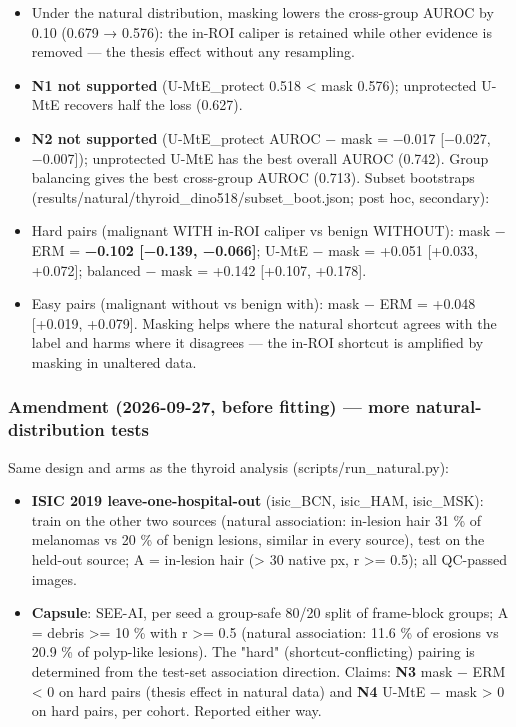 {\begin{itemize}

\item
  Under the natural distribution, masking lowers the cross-group AUROC by 0.10 (0.679 → 0.576): the in-ROI caliper is
  retained while other evidence is removed --- the thesis effect without any resampling.
\item
  \textbf{N1 not supported} (U-MtE\_protect 0.518 \textless{} mask 0.576); unprotected U-MtE recovers half the loss (0.627).
\item
  \textbf{N2 not supported} (U-MtE\_protect AUROC − mask = −0.017 {[}−0.027, −0.007{]}); unprotected U-MtE has the best overall
  AUROC (0.742). Group balancing gives the best cross-group AUROC (0.713).
  Subset bootstraps (results/natural/thyroid\_dino518/subset\_boot.json; post hoc, secondary):
\item
  Hard pairs (malignant WITH in-ROI caliper vs benign WITHOUT): mask − ERM = \textbf{−0.102 {[}−0.139, −0.066{]}};
  U-MtE − mask = +0.051 {[}+0.033, +0.072{]}; balanced − mask = +0.142 {[}+0.107, +0.178{]}.
\item
  Easy pairs (malignant without vs benign with): mask − ERM = +0.048 {[}+0.019, +0.079{]}.
  Masking helps where the natural shortcut agrees with the label and harms where it disagrees --- the in-ROI
  shortcut is amplified by masking in unaltered data.
\end{itemize}

\subsubsection{Amendment (2026-09-27, before fitting) --- more natural-distribution tests}\label{amendment-2026-09-27-before-fitting--more-natural-distribution-tests}

Same design and arms as the thyroid analysis (scripts/run\_natural.py):

\begin{itemize}

\item
  \textbf{ISIC 2019 leave-one-hospital-out} (isic\_BCN, isic\_HAM, isic\_MSK): train on the other two sources (natural
  association: in-lesion hair 31 \% of melanomas vs 20 \% of benign lesions, similar in every source), test on the held-out
  source; A = in-lesion hair (\textgreater{} 30 native px, r \textgreater= 0.5); all QC-passed images.
\item
  \textbf{Capsule}: SEE-AI, per seed a group-safe 80/20 split of frame-block groups; A = debris \textgreater= 10 \% with r \textgreater= 0.5
  (natural association: 11.6 \% of erosions vs 20.9 \% of polyp-like lesions).
  The "hard" (shortcut-conflicting) pairing is determined from the test-set association direction.
  Claims: \textbf{N3} mask − ERM \textless{} 0 on hard pairs (thesis effect in natural data) and \textbf{N4} U-MtE − mask \textgreater{} 0 on hard pairs,
  per cohort. Reported either way.
\end{itemize}

}
